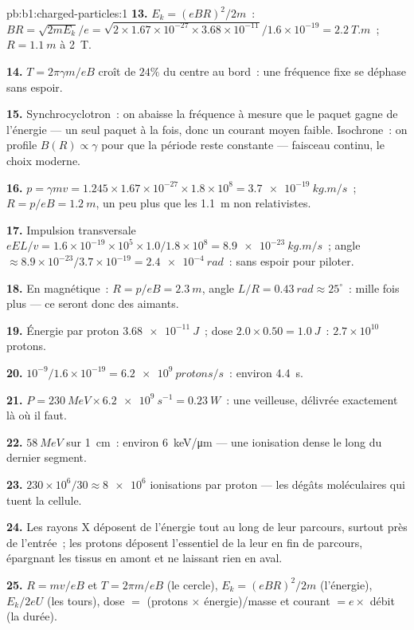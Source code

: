 \begin{solution}{pb:b1:charged-particles:1}
\textbf{13.} $E_k = (eBR)^2/2m$~: $BR = \sqrt{2mE_k}/e = \sqrt{2 \times 1.67\times
10^{-27} \times 3.68\times10^{-11}}/1.6\times10^{-19} = \qty{2.2}{T.m}$~; $R =
\qty{1.1}{m}$ à \qty{2}{T}.

\textbf{14.} $T = 2\pi\gamma m/eB$ croît de $24\%$ du centre au bord~: une
fréquence fixe se déphase sans espoir.

\textbf{15.} Synchrocyclotron~: on abaisse la fréquence à mesure que le
paquet gagne de l'énergie --- un seul paquet à la fois, donc un courant
moyen faible. Isochrone~: on profile $B(R) \propto \gamma$ pour que la
période reste constante --- faisceau continu, le choix moderne.

\textbf{16.} $p = \gamma mv = 1.245 \times 1.67\times10^{-27} \times 1.8\times10^8
= \qty{3.7e-19}{kg.m/s}$~; $R = p/eB = \qty{1.2}{m}$, un peu plus que les
\qty{1.1}{m} non relativistes.

\textbf{17.} Impulsion transversale $eEL/v = 1.6\times10^{-19} \times 10^5 \times
1.0/1.8\times10^8 = \qty{8.9e-23}{kg.m/s}$~; angle $\approx 8.9\times10^{-23}/
3.7\times10^{-19} = \qty{2.4e-4}{rad}$~: sans espoir pour piloter.

\textbf{18.} En magnétique~: $R = p/eB = \qty{2.3}{m}$, angle $L/R = \qty{0.43}{rad}
\approx 25^\circ$~: mille fois plus --- ce seront donc des aimants.

\textbf{19.} Énergie par proton $\qty{3.68e-11}{J}$~; dose $2.0 \times 0.50 =
\qty{1.0}{J}$~: $2.7\times10^{10}$ protons.

\textbf{20.} $10^{-9}/1.6\times10^{-19} = \qty{6.2e9}{protons/s}$~: environ
\qty{4.4}{s}.

\textbf{21.} $P = \qty{230}{MeV} \times \qty{6.2e9}{s^{-1}} = \qty{0.23}{W}$~:
une veilleuse, délivrée exactement là où il faut.

\textbf{22.} $\qty{58}{MeV}$ sur \qty{1}{cm}~: environ \qty{6}{keV/\micro m}
--- une ionisation dense le long du dernier segment.

\textbf{23.} $230\times10^6/30 \approx \num{8e6}$ ionisations par proton ---
les dégâts moléculaires qui tuent la cellule.

\textbf{24.} Les rayons X déposent de l'énergie tout au long de leur
parcours, surtout près de l'entrée~; les protons déposent l'essentiel de
la leur en fin de parcours, épargnant les tissus en amont et ne laissant
rien en aval.

\textbf{25.} $R = mv/eB$ et $T = 2\pi m/eB$ (le cercle), $E_k = (eBR)^2/2m$
(l'énergie), $E_k/2eU$ (les tours), dose $=$ (protons $\times$ énergie)/masse
et courant $= e \times$ débit (la durée).
\end{solution}
